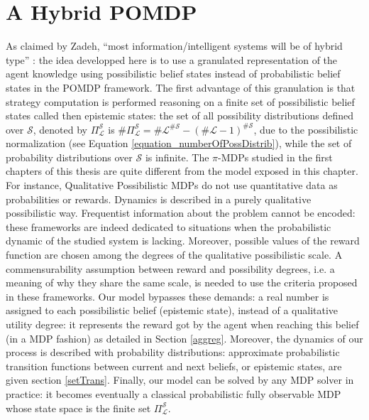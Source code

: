 \section{A Hybrid POMDP}
As claimed by Zadeh, ``most information/intelligent
systems will be of hybrid type'' \cite{DBLP:journals/soco/Zadeh98}:
the idea developped here is to use a granulated representation of the agent knowledge 
using possibilistic belief states instead of probabilistic belief states
in the POMDP framework.
The first advantage of this granulation
is that strategy computation
is performed reasoning on
a finite set of possibilistic belief states 
called then epistemic states:
the set of all possibility distributions 
defined over $\mathcal{S}$, denoted by $\Pi^{\mathcal{S}}_{\mathcal{L}}$ is
$\# \Pi^{\mathcal{S}}_{\mathcal{L}} = \# \mathcal{L}^{\# \mathcal{S}} - (\# \mathcal{L}-1)^{\# \mathcal{S}}$,
due to the possibilistic normalization (see Equation \ref{equation_numberOfPossDistrib}),
while the set of probability distributions over $\mathcal{S}$ is infinite.
The $\pi$-MDPs studied in the first chapters of this thesis 
are quite different from the model exposed in this chapter. 
For instance, Qualitative Possibilistic MDPs 
do not use quantitative data as probabilities or rewards. 
Dynamics is described in a purely qualitative possibilistic way. 
Frequentist information about the problem cannot be encoded: 
these frameworks are indeed dedicated to situations 
when the probabilistic dynamic of the studied system is lacking.
Moreover, possible values of the reward function are chosen 
among the degrees of the qualitative possibilistic scale.
A commensurability assumption between reward and possibility 
degrees, i.e. a meaning of why they share the same scale, 
is needed to use the criteria proposed in these frameworks.
Our model bypasses these demands: a real number is assigned 
to each possibilistic belief (epistemic state), 
instead of a qualitative utility degree: 
it represents the reward got by the agent 
when reaching this belief (in a MDP fashion)
as detailed in Section \ref{aggreg}. 
Moreover, the dynamics of our process 
is described with probability distributions: 
approximate probabilistic transition functions 
between current and next beliefs, or epistemic states, 
are given section \ref{setTrans}.
Finally, our model can be solved by any MDP solver in practice: 
it becomes eventually a classical probabilistic fully observable MDP
whose state space is the finite set $\Pi^{\mathcal{S}}_{\mathcal{L}}$. 

